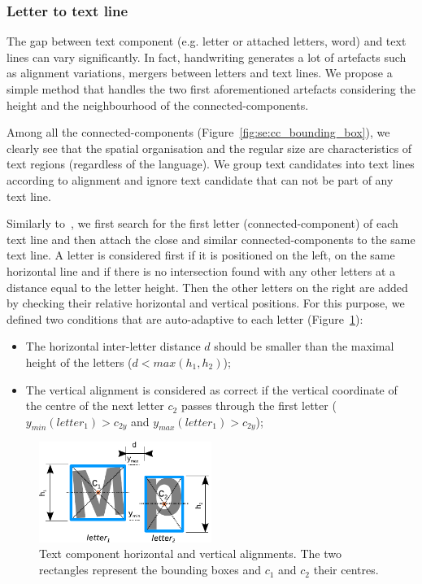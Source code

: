 \subsubsection{Letter to text line} %
\label{par:se:letter_to_line}
The gap between text component (e.g. letter or attached letters, word) and text lines can vary significantly.
In fact, handwriting generates a lot of artefacts such as alignment variations, mergers between letters and text lines.
We propose a simple method that handles the two first aforementioned artefacts considering the height and the neighbourhood of the connected-components.

Among all the connected-components (Figure~\ref{fig:se:cc_bounding_box}), we clearly see that the spatial organisation and the regular size are characteristics of text regions (regardless of the language).
We group text candidates into text lines according to alignment and ignore text candidate that can not be part of any text line.

Similarly to~\cite{Clavelli09,Li2013Comic}, we first search for the first letter (connected-component) of each text line and then attach the close and similar connected-components to the same text line.
A letter is considered first if it is positioned on the left, on the same horizontal line and if there is no intersection found with any other letters at a distance equal to the letter height.
Then the other letters on the right are added by checking their relative horizontal and vertical positions.
For this purpose, we defined two conditions that are auto-adaptive to each letter (Figure~\ref{fig:se:letter_position}):

\begin{itemize}
    \item The horizontal inter-letter distance $d$ should be smaller than the maximal height of the letters ($d<max(h_1,h_2)$);
    \item The vertical alignment is considered as correct if the vertical coordinate of the centre of the next letter $c_2$ passes through the first letter ($y_{min}(letter_1)>c_{2y}$ and $y_{max}(letter_1)>c_{2y}$);
\end{itemize}


\begin{figure}[h!]	%
  \centering
	\includegraphics[trim= 0px 0px 0px 0px, clip, width=0.5\textwidth]{letter_position.pdf}
	\caption[Text component horizontal and vertical alignments]{Text component horizontal and vertical alignments. The two rectangles represent the bounding boxes and $c_1$ and $c_2$ their centres.}
	\label{fig:se:letter_position}
\end{figure}

